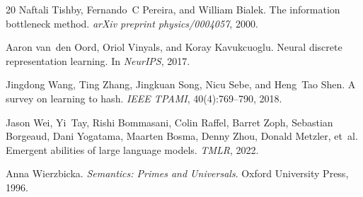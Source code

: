 \documentclass[11pt,a4paper]{article}
\begin{document}
\begin{thebibliography}{20}
Naftali Tishby, Fernando~C Pereira, and William Bialek.
\newblock The information bottleneck method.
\newblock \emph{arXiv preprint physics/0004057}, 2000.

Aaron van~den Oord, Oriol Vinyals, and Koray Kavukcuoglu.
\newblock Neural discrete representation learning.
\newblock In \emph{NeurIPS}, 2017.

Jingdong Wang, Ting Zhang, Jingkuan Song, Nicu Sebe, and Heng~Tao Shen.
\newblock A survey on learning to hash.
\newblock \emph{IEEE TPAMI}, 40(4):769--790, 2018.

Jason Wei, Yi~Tay, Rishi Bommasani, Colin Raffel, Barret Zoph, Sebastian Borgeaud, Dani Yogatama, Maarten Bosma, Denny Zhou, Donald Metzler, et~al.
\newblock Emergent abilities of large language models.
\newblock \emph{TMLR}, 2022.

Anna Wierzbicka.
\newblock \emph{Semantics: Primes and Universals}.
\newblock Oxford University Press, 1996.

\end{thebibliography}
\end{document}
